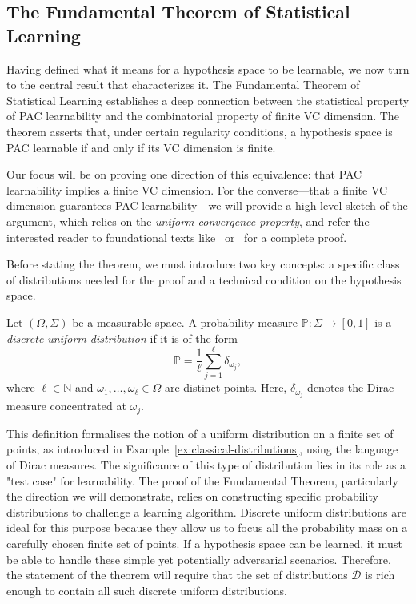 \subsection{The Fundamental Theorem of Statistical Learning}

Having defined what it means for a hypothesis space to be learnable, we now turn to the central result that characterizes it. The Fundamental Theorem of Statistical Learning establishes a deep connection between the statistical property of PAC learnability and the combinatorial property of finite VC dimension. The theorem asserts that, under certain regularity conditions, a hypothesis space is PAC learnable if and only if its VC dimension is finite.

Our focus will be on proving one direction of this equivalence: that PAC learnability implies a finite VC dimension. For the converse—that a finite VC dimension guarantees PAC learnability—we will provide a high-level sketch of the argument, which relies on the \emph{uniform convergence property}, and refer the interested reader to foundational texts like~\cite{AnthonyBartlett1999} or~\cite{UnderstandinMachineLearning} for a complete proof.

Before stating the theorem, we must introduce two key concepts: a specific class of distributions needed for the proof and a technical condition on the hypothesis space.

\begin{definition}
    Let $(\Omega, \Sigma)$ be a measurable space. A probability measure $\mathbb{P}: \Sigma \to [0,1]$ is a \emph{discrete uniform distribution} if it is of the form
    \[
        \mathbb{P} = \frac{1}{\ell} \sum_{j=1}^{\ell} \delta_{\omega_j},
    \]
    where $\ell \in \mathbb{N}$ and $\omega_1, \dots, \omega_\ell \in \Omega$ are distinct points. Here, $\delta_{\omega_j}$ denotes the Dirac measure concentrated at $\omega_j$.
\end{definition}

This definition formalises the notion of a uniform distribution on a finite set of points, as introduced in Example~\ref{ex:classical-distributions}, using the language of Dirac measures. The significance of this type of distribution lies in its role as a "test case" for learnability. The proof of the Fundamental Theorem, particularly the direction we will demonstrate, relies on constructing specific probability distributions to challenge a learning algorithm. Discrete uniform distributions are ideal for this purpose because they allow us to focus all the probability mass on a carefully chosen finite set of points. If a hypothesis space can be learned, it must be able to handle these simple yet potentially adversarial scenarios. Therefore, the statement of the theorem will require that the set of distributions $\mathcal{D}$ is rich enough to contain all such discrete uniform distributions.

